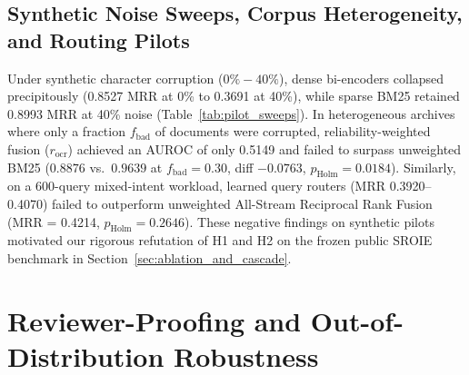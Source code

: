 \documentclass[conference]{IEEEtran}
\begin{document}
\subsection{Synthetic Noise Sweeps, Corpus Heterogeneity, and Routing Pilots}
\label{sec:diagnostic_extensions}
\label{sec:coco_eval}
Under synthetic character corruption ($0\%-40\%$), dense bi-encoders collapsed precipitously (0.8527 MRR at 0\% to 0.3691 at 40\%), while sparse BM25 retained 0.8993 MRR at 40\% noise (Table~\ref{tab:pilot_sweeps}). In heterogeneous archives where only a fraction $f_{\text{bad}}$ of documents were corrupted, reliability-weighted fusion ($r_{\text{ocr}}$) achieved an AUROC of only 0.5149 and failed to surpass unweighted BM25 ($0.8876$ vs.\ $0.9639$ at $f_{\text{bad}}=0.30$, diff $-0.0763$, $p_{\text{Holm}}=0.0184$). Similarly, on a 600-query mixed-intent workload, learned query routers (MRR 0.3920--0.4070) failed to outperform unweighted All-Stream Reciprocal Rank Fusion (MRR = 0.4214, $p_{\text{Holm}}=0.2646$). These negative findings on synthetic pilots motivated our rigorous refutation of H1 and H2 on the frozen public SROIE benchmark in Section~\ref{sec:ablation_and_cascade}.

\begin{table}[h]
\centering
\small
\caption{Preliminary Synthetic Noise Sweeps, Heterogeneous Corruption ($f_{\text{bad}}$), and Mixed-Intent Routing ($N=600$).}
\label{tab:pilot_sweeps}
\end{table}




\section{Reviewer-Proofing and Out-of-Distribution Robustness}
\label{sec:appendix_reviewer_proofing}
\end{document}
